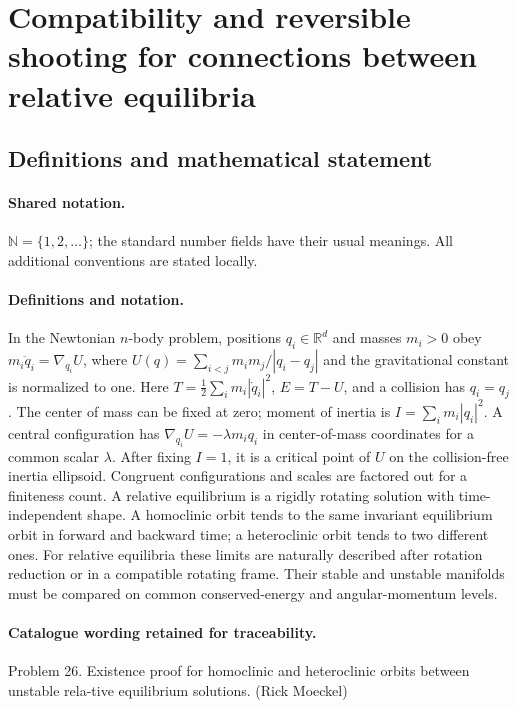 \documentclass[11pt]{article}
\begin{document}
\section{Compatibility and reversible shooting for connections between relative equilibria}\label{statement}

\subsection{Definitions and mathematical statement}

\paragraph{Shared notation.}$\mathbb N=\{1,2,\ldots\}$; the standard number fields have their usual meanings. All additional conventions are stated locally.


\paragraph{Definitions and notation.}In the Newtonian $n$-body problem, positions $q_i\in\mathbb R^d$ and masses $m_i>0$ obey $m_i\ddot q_i=\nabla_{q_i}U$, where $U(q)=\sum_{i<j}m_im_j/|q_i-q_j|$ and the gravitational constant is normalized to one. Here $T=\tfrac12\sum_i m_i|\dot q_i|^2$, $E=T-U$, and a collision has $q_i=q_j$. The center of mass can be fixed at zero; moment of inertia is $I=\sum_i m_i|q_i|^2$. A central configuration has $\nabla_{q_i}U=-\lambda m_iq_i$ in center-of-mass coordinates for a common scalar $\lambda$. After fixing $I=1$, it is a critical point of $U$ on the collision-free inertia ellipsoid. Congruent configurations and scales are factored out for a finiteness count. A relative equilibrium is a rigidly rotating solution with time-independent shape. A homoclinic orbit tends to the same invariant equilibrium orbit in forward and backward time; a heteroclinic orbit tends to two different ones. For relative equilibria these limits are naturally described after rotation reduction or in a compatible rotating frame. Their stable and unstable manifolds must be compared on common conserved-energy and angular-momentum levels.

\paragraph{Catalogue wording retained for traceability.}
Problem 26. Existence proof for homoclinic and heteroclinic orbits between unstable rela-tive equilibrium solutions. (Rick Moeckel)
\end{document}
